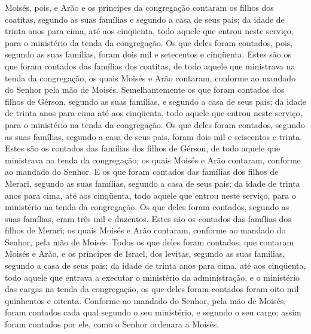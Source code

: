 Moisés, pois, e Arão e os príncipes da congregação contaram os
filhos dos coatitas, segundo as suas famílias e segundo a casa de
seus pais; da idade de trinta anos para cima, até aos
cinqüenta, todo aquele que entrou neste serviço, para o ministério
da tenda da congregação. Os que deles foram contados, pois,
segundo as suas famílias, foram dois mil e setecentos e cinqüenta.
Estes são os que foram contados das famílias dos coatitas, de
todo aquele que ministrava na tenda da congregação, os quais Moisés
e Arão contaram, conforme ao mandado do Senhor pela mão de Moisés.
Semelhantemente os que foram contados dos filhos de Gérson,
segundo as suas famílias, e segundo a casa de seus pais; da
idade de trinta anos para cima até aos cinqüenta, todo aquele que
entrou neste serviço, para o ministério na tenda da congregação.
Os que deles foram contados, segundo as suas famílias,
segundo a casa de seus pais, foram dois mil e seiscentos e trinta.
Estes são os contados das famílias dos filhos de Gérson, de
todo aquele que ministrava na tenda da congregação; os quais Moisés
e Arão contaram, conforme ao mandado do Senhor. E os que
foram contados das famílias dos filhos de Merari, segundo as suas
famílias, segundo a casa de seus pais; da idade de trinta
anos para cima, até aos cinqüenta, todo aquele que entrou neste
serviço, para o ministério na tenda da congregação. Os que
deles foram contados, segundo as suas famílias, eram três mil e
duzentos. Estes são os contados das famílias dos filhos de
Merari; os quais Moisés e Arão contaram, conforme ao mandado do
Senhor, pela mão de Moisés. Todos os que deles foram
contados, que contaram Moisés e Arão, e os príncipes de Israel, dos
levitas, segundo as suas famílias, segundo a casa de seus pais;
da idade de trinta anos para cima, até aos cinqüenta, todo
aquele que entrava a executar o ministério da administração, e o
ministério das cargas na tenda da congregação, os que deles
foram contados foram oito mil quinhentos e oitenta. Conforme
ao mandado do Senhor, pela mão de Moisés, foram contados cada qual
segundo o seu ministério, e segundo o seu cargo; assim foram
contados por ele, como o Senhor ordenara a Moisés.

\medskip

